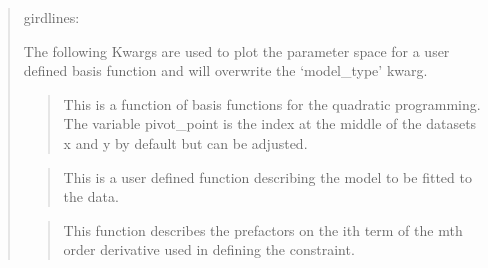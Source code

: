 \documentclass[letterpaper,10pt,english]{sphinxmanual}
\begin{document}
\begin{fulllineitems}
\begin{quote}
\begin{description}
\item[{girdlines: }] \leavevmode
{}

\end{description}

The following Kwargs are used to plot the parameter space for a user
defined basis function and will overwrite the ‘model\_type’ kwarg.

\begin{quote}

\begin{DUlineblock}{0em}
\item[] This is a function of basis functions
for the quadratic programming. The variable pivot\_point is the
index at the middle of the datasets x and y by default but can
be adjusted.
\end{DUlineblock}
\end{quote}

\begin{quote}

\begin{DUlineblock}{0em}
\item[] This is
a user defined function describing the model to be fitted to the
data.
\end{DUlineblock}
\end{quote}

\begin{quote}

\begin{DUlineblock}{0em}
\item[] This function describes the prefactors on the ith term of the mth
order derivative used in defining the constraint.
\end{DUlineblock}
\end{quote}

\begin{quote}


\end{quote}
\end{quote}
\end{fulllineitems}
\end{document}
